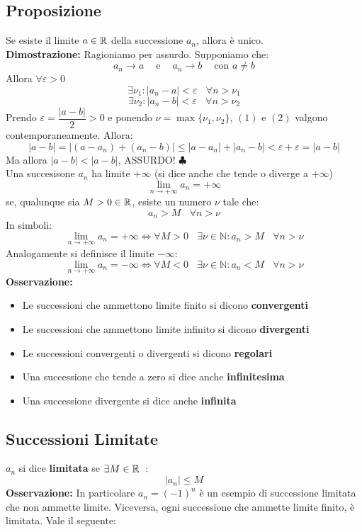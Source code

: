 \documentclass[../../main.tex]{subfiles}
\begin{document}
\subsection{Proposizione}
Se esiste il limite $a\in\mathbb{R}$ della successione $a_n$, allora è unico.\\
\textbf{Dimostrazione:} Ragioniamo per assurdo. Supponiamo che:
\[
    a_n \to a \ \ \ \ \text{ e } \ \ \ \ a_n \to b \ \ \ \ \text{ con } a \neq b
\]
Allora $\forall\varepsilon > 0$
\[
    \exists \nu_1 : |a_n - a| < \varepsilon \ \ \ \ \forall n > \nu_1
\]
\[
    \exists \nu_2 : |a_n - b| < \varepsilon \ \ \ \ \forall n > \nu_2
\]
Prendo $\varepsilon = \dfrac{|a-b|}{2} > 0$ e ponendo $\nu = \max\{\nu_1,
    \nu_2\}$, $(1) \text{ e } (2)$ valgono contemporaneamente. Allora:
\[
    |a-b| = |(a-a_n) + (a_n-b)| \leq |a-a_n| + |a_n-b| < \varepsilon + \varepsilon = |a-b|
\]
Ma allora $|a-b| < |a-b|$, ASSURDO! $\clubsuit$ \\ Una succesisone $a_n$ ha
limite $+\infty$ (si dice anche che tende o diverge a $+\infty$)
\[
    \lim_{n\to+\infty}a_n = +\infty \]
se, qualunque sia $M > 0 \in \mathbb{R}$, esiste un numero $\nu$ tale che:
\[
    a_n > M \ \ \ \ \forall n > \nu
\]
In simboli:
\[
    \lim_{n\to+\infty}a_n = +\infty \iff \forall M > 0 \ \ \ \ \exists \nu \in \mathbb{N} : a_n > M \ \ \ \ \forall n > \nu
\]
Analogamente si definisce il limite $-\infty$:
\[
    \lim_{n\to+\infty}a_n = -\infty \iff \forall M < 0 \ \ \ \ \exists \nu \in \mathbb{N} : a_n < M \ \ \ \ \forall n > \nu
\]
\textbf{Osservazione:} \begin{itemize}
    \item Le successioni che ammettono limite finito si dicono \textbf{convergenti}
    \item Le successioni che ammettono limite infinito si dicono \textbf{divergenti}
    \item Le successioni convergenti o divergenti si dicono \textbf{regolari}
    \item Una successione che tende a zero si dice anche \textbf{infinitesima}
    \item Una successione divergente si dice anche \textbf{infinita}
\end{itemize}

\subsection{Successioni Limitate}
$a_n$ si dice \textbf{limitata} se $\exists M\in\mathbb{R} \ : $
\[
    |a_n| \leq M
\]
\textbf{Osservazione:} In particolare $a_n = (-1)^n$ è un esempio di successione limitata che non ammette limite. Viceversa, ogni successione che ammette limite finito, è limitata. Vale il seguente:
\end{document}
